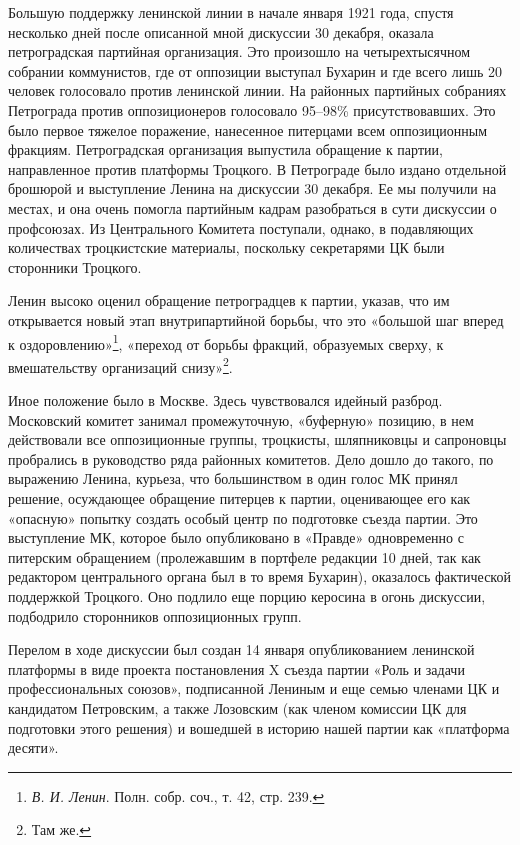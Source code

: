 \documentclass[12pt, a4paper, openany]{book}
\begin{document}
Большую поддержку ленинской линии в начале января 1921 года, спустя несколько дней после описанной мной дискуссии 30 декабря, оказала петроградская партийная организация. Это произошло на четырехтысячном собрании коммунистов, где от оппозиции выступал Бухарин и где всего лишь 20 человек голосовало против ленинской линии. На районных партийных собраниях Петрограда против оппозиционеров голосовало 95–98\% присутствовавших. Это было первое тяжелое поражение, нанесенное питерцами всем оппозиционным фракциям. Петроградская организация выпустила обращение к партии, направленное против платформы Троцкого. В Петрограде было издано отдельной брошюрой и выступление Ленина на дискуссии 30 декабря. Ее мы получили на местах, и она очень помогла партийным кадрам разобраться в сути дискуссии о профсоюзах. Из Центрального Комитета поступали, однако, в подавляющих количествах троцкистские материалы, поскольку секретарями ЦК были сторонники Троцкого.

Ленин высоко оценил обращение петроградцев к партии, указав, что им открывается новый этап внутрипартийной борьбы, что это «большой шаг вперед к оздоровлению»\footnote{\textit{В. И. Ленин}. Полн. собр. соч., т. 42, стр. 239.}, «переход от борьбы фракций, образуемых сверху, к вмешательству организаций снизу»\footnote{Там же.}.

Иное положение было в Москве. Здесь чувствовался идейный разброд. Московский комитет занимал промежуточную, «буферную» позицию, в нем действовали все оппозиционные группы, троцкисты, шляпниковцы и сапроновцы пробрались в руководство ряда районных комитетов. Дело дошло до такого, по выражению Ленина, курьеза, что большинством в один голос МК принял решение, осуждающее обращение питерцев к партии, оценивающее его как «опасную» попытку создать особый центр по подготовке съезда партии. Это выступление МК, которое было опубликовано в «Правде» одновременно с питерским обращением (пролежавшим в портфеле редакции 10 дней, так как редактором центрального органа был в то время Бухарин), оказалось фактической поддержкой Троцкого. Оно подлило еще порцию керосина в огонь дискуссии, подбодрило сторонников оппозиционных групп.

Перелом в ходе дискуссии был создан 14 января опубликованием ленинской платформы в виде проекта постановления X съезда партии «Роль и задачи профессиональных союзов», подписанной Лениным и еще семью членами ЦК и кандидатом Петровским, а также Лозовским (как членом комиссии ЦК для подготовки этого решения) и вошедшей в историю нашей партии как «платформа десяти».
\end{document}
